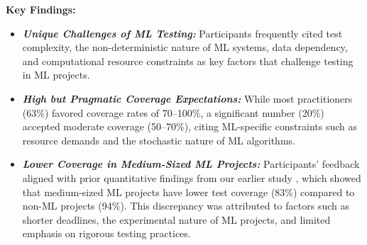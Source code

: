 \begin{highlightbox}
\textbf{Key Findings:}
\begin{itemize}
    \item \textbf{\textit{Unique Challenges of ML Testing:}} Participants frequently cited test complexity, the non-deterministic nature of ML systems, data dependency, and computational resource constraints as key factors that challenge testing in ML projects.


    \item \textbf{\textit{High but Pragmatic Coverage Expectations:}} While most practitioners (63\%) favored coverage rates of 70–100\%, a significant number (20\%) accepted moderate coverage (50–70\%), citing ML-specific constraints such as resource demands and the stochastic nature of ML algorithms.



    \item \textbf{\textit{Lower Coverage in Medium-Sized ML Projects:}} 
    Participants' feedback aligned with prior quantitative findings from our earlier study \citep{bernardo2024machine}, which showed that medium-sized ML projects have lower test coverage (83\%) compared to non-ML projects (94\%). This discrepancy was attributed to factors such as shorter deadlines, the experimental nature of ML projects, and limited emphasis on rigorous testing practices.
\end{itemize}
\end{highlightbox}
